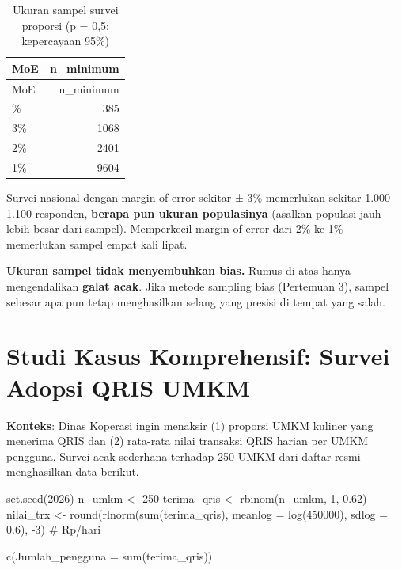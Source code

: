 \documentclass[
  indonesian,
  letterpaper,
]{book}
\newenvironment{Shaded}{\begin{snugshade}}{\end{snugshade}}
\newcommand{\AttributeTok}[1]{\textcolor[rgb]{0.40,0.45,0.13}{#1}}
\newcommand{\CommentTok}[1]{\textcolor[rgb]{0.37,0.37,0.37}{#1}}
\newcommand{\DecValTok}[1]{\textcolor[rgb]{0.68,0.00,0.00}{#1}}
\newcommand{\FloatTok}[1]{\textcolor[rgb]{0.68,0.00,0.00}{#1}}
\newcommand{\FunctionTok}[1]{\textcolor[rgb]{0.28,0.35,0.67}{#1}}
\newcommand{\NormalTok}[1]{\textcolor[rgb]{0.00,0.23,0.31}{#1}}
\newcommand{\OtherTok}[1]{\textcolor[rgb]{0.00,0.23,0.31}{#1}}
\newcommand{\SpecialCharTok}[1]{\textcolor[rgb]{0.37,0.37,0.37}{#1}}
\begin{document}
\begin{longtable}[]{@{}lr@{}}
\caption{Ukuran sampel survei proporsi (p = 0,5; kepercayaan
95\%)}\tabularnewline
\toprule\noalign{}
MoE & n\_minimum \\
\midrule\noalign{}
\endfirsthead
\toprule\noalign{}
MoE & n\_minimum \\
\midrule\noalign{}
\endhead
\bottomrule\noalign{}
\endlastfoot
5\% & 385 \\
3\% & 1068 \\
2\% & 2401 \\
1\% & 9604 \\
\end{longtable}

Survei nasional dengan margin of error sekitar ± 3\% memerlukan sekitar
1.000--1.100 responden, \textbf{berapa pun ukuran populasinya} (asalkan
populasi jauh lebih besar dari sampel). Memperkecil margin of error dari
2\% ke 1\% memerlukan sampel empat kali lipat.

\textbf{Ukuran sampel tidak menyembuhkan bias.} Rumus di atas hanya
mengendalikan \textbf{galat acak}. Jika metode sampling bias (Pertemuan
3), sampel sebesar apa pun tetap menghasilkan selang yang presisi di
tempat yang salah.

\section{Studi Kasus Komprehensif: Survei Adopsi QRIS
UMKM}\label{studi-kasus-komprehensif-survei-adopsi-qris-umkm}

\textbf{Konteks}: Dinas Koperasi ingin menaksir (1) proporsi UMKM
kuliner yang menerima QRIS dan (2) rata-rata nilai transaksi QRIS harian
per UMKM pengguna. Survei acak sederhana terhadap 250 UMKM dari daftar
resmi menghasilkan data berikut.

\begin{Shaded}
\begin{Highlighting}[]
\FunctionTok{set.seed}\NormalTok{(}\DecValTok{2026}\NormalTok{)}
\NormalTok{n\_umkm      }\OtherTok{\textless{}{-}} \DecValTok{250}
\NormalTok{terima\_qris }\OtherTok{\textless{}{-}} \FunctionTok{rbinom}\NormalTok{(n\_umkm, }\DecValTok{1}\NormalTok{, }\FloatTok{0.62}\NormalTok{)}
\NormalTok{nilai\_trx   }\OtherTok{\textless{}{-}} \FunctionTok{round}\NormalTok{(}\FunctionTok{rlnorm}\NormalTok{(}\FunctionTok{sum}\NormalTok{(terima\_qris), }\AttributeTok{meanlog =} \FunctionTok{log}\NormalTok{(}\DecValTok{450000}\NormalTok{), }\AttributeTok{sdlog =} \FloatTok{0.6}\NormalTok{), }\SpecialCharTok{{-}}\DecValTok{3}\NormalTok{)  }\CommentTok{\# Rp/hari}

\FunctionTok{c}\NormalTok{(}\AttributeTok{Jumlah\_pengguna =} \FunctionTok{sum}\NormalTok{(terima\_qris))}
\end{Highlighting}
\end{Shaded}
\end{document}
